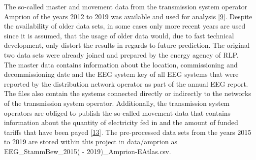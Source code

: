 \documentclass[a4paper,11pt]{article}
\begin{document}
The so-called master and movement data from the transmission system operator Amprion of the years 2012 to 2019 was available and used for analysis {[}\protect\hyperlink{ref-EnergieagenturRheinlandPfalz.2021}{9}{]}. Despite the availability of older data sets, in some cases only more recent years are used since it is assumed, that the usage of older data would, due to fast technical development, only distort the results in regards to future prediction. The original two data sets were already joined and prepared by the energy agency of RLP. The master data contains information about the location, commissioning and decommissioning date and the EEG system key of all EEG systems that were reported by the distribution network operator as part of the annual EEG report. The files also contain the systems connected directly or indirectly to the networks of the transmission system operator. Additionally, the transmission system operators are obliged to publish the so-called movement data that contains information about the quantity of electricity fed in and the amount of funded tariffs that have been payed {[}\protect\hyperlink{ref-AmprionGmbH.2019}{13}{]}. The pre-processed data sets from the years 2015 to 2019 are stored within this project in data/amprion as EEG\_StammBew\_2015( - 2019)\_Amprion-EAtlas.csv.
\end{document}
